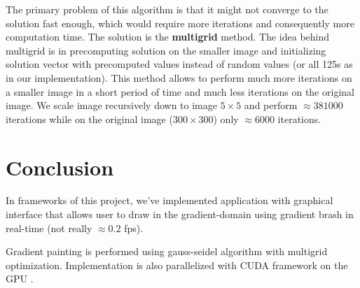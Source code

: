 \documentclass[hidelinks, english]{report}
\begin{document}
    The primary problem of this algorithm is that it might not converge to the solution fast enough, which would require
    more iterations and consequently more computation time. The solution is the \textbf{multigrid} method. The idea behind
    multigrid is in precomputing solution on the smaller image and initializing solution vector with precomputed values
    instead of random values (or all 125s as in our implementation). This method allows to perform much more iterations on
    a smaller image in a short period of time and much less iterations on the original image. We scale image recursively
    down to image $5 \times 5$ and perform $\approx 381000$ iterations while on the original image ($300 \times 300$) only
    $\approx 6000$ iterations.


    \section{Conclusion}

    In frameworks of this project, we've implemented application with graphical interface that allows user to draw in
    the gradient-domain using gradient brash in real-time (not really  $\approx 0.2$ fps).

    Gradient painting is performed using gauss-seidel algorithm with multigrid optimization. Implementation is also
    parallelized with CUDA framework on the GPU .


    
\end{document}
